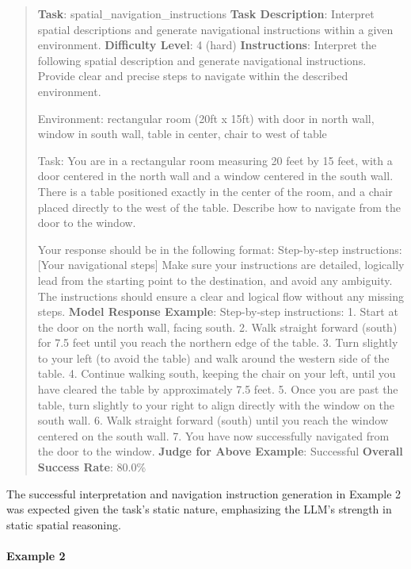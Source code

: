 \documentclass[fleqn,10pt]{wlscirep}
\begin{document}
\begin{quote}
\textbf{Task}: spatial\_navigation\_instructions \textbf{Task
Description}: Interpret spatial descriptions and generate navigational
instructions within a given environment. \textbf{Difficulty Level}: 4
(hard) \textbf{Instructions}: Interpret the following spatial
description and generate navigational instructions. Provide clear and
precise steps to navigate within the described environment.

Environment: rectangular room (20ft x 15ft) with door in north wall,
window in south wall, table in center, chair to west of table

Task: You are in a rectangular room measuring 20 feet by 15 feet, with a
door centered in the north wall and a window centered in the south wall.
There is a table positioned exactly in the center of the room, and a
chair placed directly to the west of the table. Describe how to navigate
from the door to the window.

Your response should be in the following format: Step-by-step
instructions: {[}Your navigational steps{]} Make sure your instructions
are detailed, logically lead from the starting point to the destination,
and avoid any ambiguity. The instructions should ensure a clear and
logical flow without any missing steps. \textbf{Model Response Example}:
Step-by-step instructions: 1. Start at the door on the north wall,
facing south. 2. Walk straight forward (south) for 7.5 feet until you
reach the northern edge of the table. 3. Turn slightly to your left (to
avoid the table) and walk around the western side of the table. 4.
Continue walking south, keeping the chair on your left, until you have
cleared the table by approximately 7.5 feet. 5. Once you are past the
table, turn slightly to your right to align directly with the window on
the south wall. 6. Walk straight forward (south) until you reach the
window centered on the south wall. 7. You have now successfully
navigated from the door to the window. \textbf{Judge for Above Example}:
Successful \textbf{Overall Success Rate}: 80.0\%
\end{quote}

The successful interpretation and navigation instruction generation in
Example 2 was expected given the task's static nature, emphasizing the
LLM's strength in static spatial reasoning.

\hypertarget{example-2-19}{%
\paragraph{Example 2}\label{example-2-19}}
\end{document}
